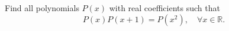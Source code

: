 Find all polynomials $P(x)$ with real coefficients such that
\[P(x)P(x + 1) = P(x^2), \quad \forall x \in \mathbb R.\]
